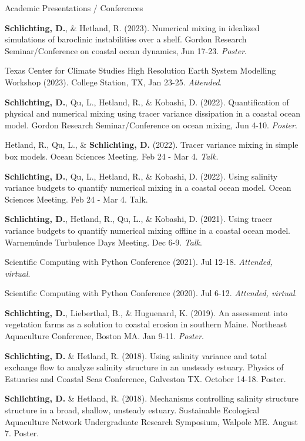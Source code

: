 \documentclass{resume} %
\begin{document}
\begin{rSection}{Academic Presentations / Conferences} \itemsep -3pt
\begin{etaremune}
    \item \textbf{Schlichting, D.}, \& Hetland, R. (2023). Numerical mixing in idealized simulations of baroclinic instabilities over a shelf. Gordon Research Seminar/Conference on coastal ocean dynamics, Jun 17-23. \textit{Poster}.
    \item Texas Center for Climate Studies High Resolution Earth System Modelling Workshop (2023). College Station, TX, Jan 23-25. \textit{Attended}.
    \item \textbf{Schlichting, D.}, Qu, L., Hetland, R., \& Kobashi, D. (2022). Quantification of physical and numerical mixing using tracer variance dissipation in a coastal ocean model. Gordon Research Seminar/Conference on ocean mixing, Jun 4-10. \textit{Poster}.
    \item Hetland, R., Qu, L., \& \textbf{Schlichting, D.} (2022). Tracer variance mixing in simple box models. Ocean Sciences Meeting. Feb 24 - Mar 4. \textit{Talk}.
    \item \textbf{Schlichting, D.}, Qu, L., Hetland, R., \& Kobashi, D. (2022). Using salinity variance budgets to quantify numerical mixing in a coastal ocean model. Ocean Sciences Meeting. Feb 24 - Mar 4. Talk. 
    \item \textbf{Schlichting, D.}, Hetland, R., Qu, L., \& Kobashi, D. (2021). Using tracer variance budgets to quantify numerical mixing offline in a coastal ocean model. Warnem\"{u}nde Turbulence Days Meeting. Dec 6-9. \textit{Talk}. 
    \item Scientific Computing with Python Conference (2021). Jul 12-18. \textit{Attended, virtual}. 
    \item Scientific Computing with Python Conference (2020). Jul 6-12.  \textit{Attended, virtual}.
    \item \textbf{Schlichting, D.}, Lieberthal, B., \& Huguenard, K. (2019). An assessment into vegetation farms as a solution to coastal erosion in southern Maine. Northeast Aquaculture Conference, Boston MA. Jan 9-11. \textit{Poster}.
    \item \textbf{Schlichting, D.} \& Hetland, R. (2018). Using salinity variance and total exchange flow to analyze salinity structure in an unsteady estuary. Physics of Estuaries and Coastal Seas Conference, Galveston TX. October 14-18. Poster.
    \item \textbf{Schlichting, D.} \& Hetland, R. (2018). Mechanisms controlling salinity structure structure in a broad, shallow, unsteady estuary. Sustainable Ecological Aquaculture Network Undergraduate Research Symposium, Walpole ME. August 7. Poster.

\end{etaremune}
\end{rSection}
\end{document}
